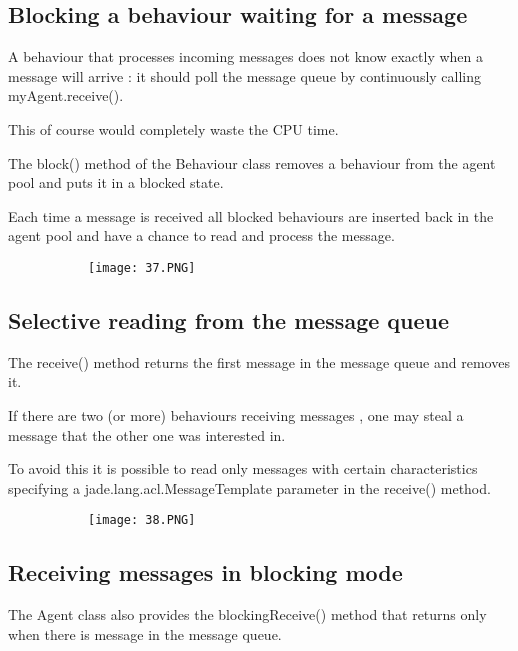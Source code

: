 \documentclass{article}
\begin{document}
\subsection{Blocking a behaviour waiting for a message}

A behaviour that processes incoming messages does not know exactly when a message will arrive : it should poll the message queue by continuously calling myAgent.receive().

This of course would completely waste the CPU time.

The block() method of the Behaviour class removes a behaviour from the agent pool and puts it in a blocked state.

Each time a message is received all blocked behaviours are inserted back in the agent pool and have a chance to read and process the message.

\begin{figure}[ht!]
  \centering
  \begin{subfigure}[b]{0.6\linewidth}
    \texttt{[image: 37.PNG]}
  \end{subfigure}
  \end{figure}

\subsection{Selective reading from the message queue}

The receive() method returns the first message in the message queue and removes it.

If there are two (or more) behaviours receiving messages , one may steal a message that the other one was interested in.

To avoid this it is possible to read only messages with certain characteristics specifying a jade.lang.acl.MessageTemplate parameter in the receive() method.

\begin{figure}[ht!]
  \centering
  \begin{subfigure}[b]{0.6\linewidth}
    \texttt{[image: 38.PNG]}
  \end{subfigure}
  \end{figure}

\subsection{Receiving messages in blocking mode}

The Agent class also provides the blockingReceive() method that returns only when there is message in the message queue.
\end{document}
